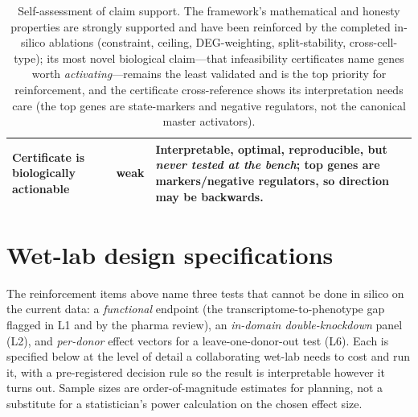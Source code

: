 \documentclass[11pt]{article}
\newcommand{\sev}[2]{\textcolor{#1}{\textbf{#2}}}
\begin{document}
\begin{table}[h]
\begin{tabularx}{\textwidth}{@{}l c X@{}}
Certificate is biologically actionable & \sev{sev1}{weak} & Interpretable, optimal, reproducible, but \emph{never tested at the bench}; top genes are markers/negative regulators, so direction may be backwards. \\
\bottomrule
\end{tabularx}
\caption{Self-assessment of claim support. The framework's mathematical and honesty properties
are strongly supported and have been reinforced by the completed in-silico ablations (constraint,
ceiling, DEG-weighting, split-stability, cross-cell-type); its most novel biological
claim---that infeasibility certificates name genes worth \emph{activating}---remains the least
validated and is the top priority for reinforcement, and the certificate cross-reference shows
its interpretation needs care (the top genes are state-markers and negative regulators, not the
canonical master activators).}
\label{tab:scorecard}
\end{table}

\section{Wet-lab design specifications}
\noindent
The reinforcement items above name three tests that cannot be done in silico on the current
data: a \emph{functional} endpoint (the transcriptome-to-phenotype gap flagged in L1 and by the
pharma review), an \emph{in-domain double-knockdown} panel (L2), and \emph{per-donor} effect
vectors for a leave-one-donor-out test (L6). Each is specified below at the level of detail a
collaborating wet-lab needs to cost and run it, with a pre-registered decision rule so the result
is interpretable however it turns out. Sample sizes are order-of-magnitude estimates for planning,
not a substitute for a statistician's power calculation on the chosen effect size.
\end{document}
